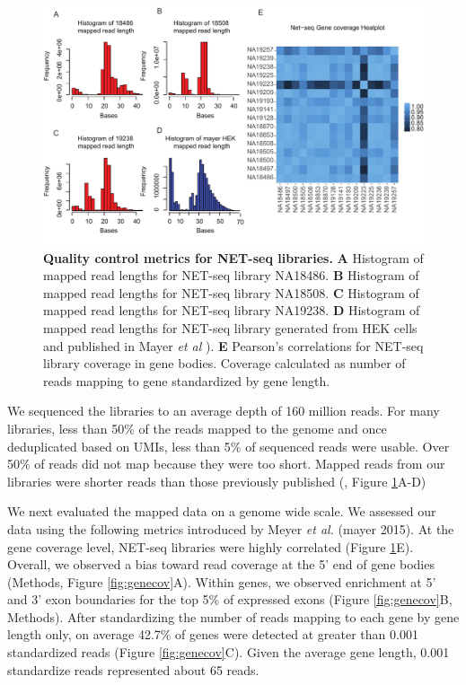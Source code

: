 \begin{figure}
\centering \includegraphics[trim=0 .3in 0
  0,clip,width=5in]{img/ch04/Figure2.pdf}
\caption[Quality control metrics for NET-seq libraries.]{\textbf{Quality control metrics for NET-seq libraries.} {\bf A} Histogram of mapped read lengths for NET-seq library NA18486. {\bf B} Histogram of mapped read lengths for NET-seq library NA18508. {\bf C} Histogram of mapped read lengths for NET-seq library NA19238. {\bf D} Histogram of mapped read lengths for NET-seq library generated from HEK cells and published in Mayer \emph{et al} \citep{mayer_native_2015}). {\bf E} Pearson's correlations for NET-seq library coverage in gene bodies. Coverage calculated as number of reads mapping to gene standardized by gene length.}
\label{fig:qualCont}
\end{figure}

We sequenced the libraries to an average depth of 160 million reads. For many libraries, less than 50\% of the reads mapped to the genome and once deduplicated based on UMIs, less than 5\% of sequenced reads were usable. Over 50\% of reads did not map because they were too short. Mapped reads from our libraries were shorter reads than those previously published (\citep{mayer_native_2015}, Figure \ref{fig:qualCont}A-D)


We next evaluated the mapped data on a genome wide scale. We assessed our data using the following metrics introduced by Meyer \emph{et al.} (mayer 2015). At the gene coverage level, NET-seq libraries were highly correlated (Figure \ref{fig:qualCont}E). Overall, we observed a bias toward read coverage at the 5' end of gene bodies (Methods, Figure \ref{fig:genecov}A).  Within genes, we observed enrichment at 5' and 3' exon boundaries for the top 5\% of expressed exons (Figure \ref{fig:genecov}B, Methods). After standardizing the number of reads mapping to each gene by gene length only, on average 42.7\% of genes were detected at greater than 0.001 standardized reads (Figure \ref{fig:genecov}C). Given the average gene length, 0.001 standardize reads represented about 65 reads. 



